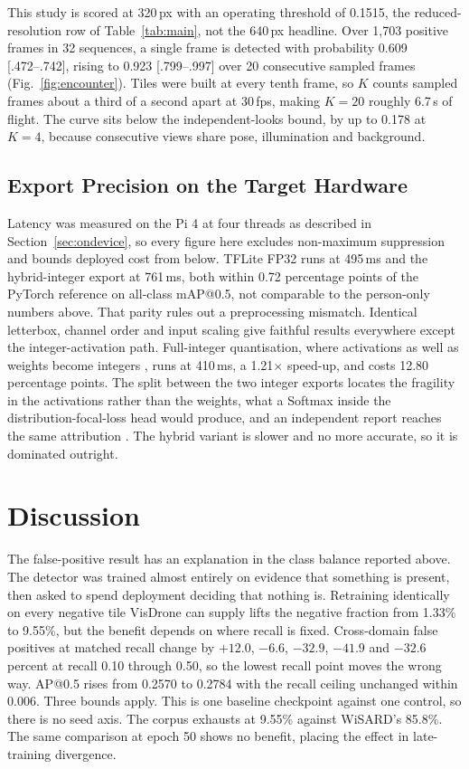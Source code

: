\documentclass[conference]{IEEEtran}
\begin{document}
This study is scored at 320\,px with an operating threshold of 0.1515, the
reduced-resolution row of Table~\ref{tab:main}, not the 640\,px headline. Over
1,703 positive frames in 32 sequences, a single frame is detected with
probability 0.609 [.472--.742], rising to 0.923 [.799--.997] over 20 consecutive
sampled frames (Fig.~\ref{fig:encounter}). Tiles were built at every tenth
frame, so $K$ counts sampled frames about a third of a second apart at 30\,fps,
making $K=20$ roughly 6.7\,s of flight. The curve sits below the
independent-looks bound, by up to 0.178 at $K=4$, because consecutive views
share pose, illumination and background.

\subsection{Export Precision on the Target Hardware}

Latency was measured on the Pi 4 at four threads as described in
Section~\ref{sec:ondevice}, so every figure here excludes non-maximum
suppression and bounds deployed cost from below. TFLite FP32 runs at 495\,ms and
the hybrid-integer export at 761\,ms, both within 0.72 percentage points of the
PyTorch reference on all-class mAP@0.5, not comparable to the person-only
numbers above. That parity rules out a preprocessing mismatch. Identical
letterbox, channel order and input scaling give faithful results everywhere
except the integer-activation path. Full-integer quantisation, where activations
as well as weights become integers \cite{jacob2018,gholami2022}, runs at
410\,ms, a 1.21$\times$ speed-up, and costs 12.80 percentage points. The split
between the two integer exports locates the fragility in the activations rather
than the weights, what a Softmax inside the distribution-focal-loss head would
produce, and an independent report reaches the same attribution \cite{chen2026}.
The hybrid variant is slower and no more accurate, so it is dominated outright.

\section{Discussion}
\label{sec:discussion}

The false-positive result has an explanation in the class balance reported
above. The detector was trained almost entirely on evidence that something is
present, then asked to spend deployment deciding that nothing is. Retraining
identically on every negative tile VisDrone can supply lifts the negative
fraction from 1.33\% to 9.55\%, but the benefit depends on where recall is
fixed. Cross-domain false positives at matched recall change by $+12.0$,
$-6.6$, $-32.9$, $-41.9$ and $-32.6$ percent at recall 0.10 through 0.50, so the
lowest recall point moves the wrong way. AP@0.5 rises from 0.2570 to 0.2784 with
the recall ceiling unchanged within 0.006. Three bounds apply. This is one
baseline checkpoint against one control, so there is no seed axis. The corpus
exhausts at 9.55\% against WiSARD's 85.8\%. The same comparison at epoch 50
shows no benefit, placing the effect in late-training divergence.
\end{document}
